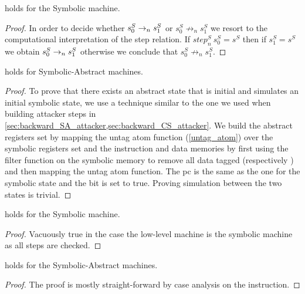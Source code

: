 \begin{lemma}
  \label{step_classic_symbolic}
   holds for the Symbolic machine.
\end{lemma}
\begin{proof}
  In order to decide whether $s^S_0\to_ns^S_1$ or
  $s^S_0 \not \to_n s^S_1$ we resort to the computational interpretation
  of the step relation. If $step^S_n ~ s^S_0 = s^S$ then if
  $s^S_1 = s^S$ we obtain $s^S_0\to_ns^S_1$ otherwise
  we conclude that $s^S_0 \not \to_n s^S_1$.
\end{proof}
\begin{lemma}
  \label{initial_refine_SA}
   holds for Symbolic-Abstract machines.
\end{lemma}
\begin{proof}
  To prove that there exists an abstract
  state that is initial and simulates an initial symbolic state, we
  use a technique similar to the one we used when building attacker
  steps in \cref{sec:backward_SA_attacker,sec:backward_CS_attacker}.
  We build the abstract registers set by mapping the untag atom
  function (\cref{untag_atom}) over the symbolic registers set and the
  instruction and data memories by first using the filter function on
  the symbolic memory to remove all data tagged \DATAname
  (respectively \INSTRname) and then mapping the untag atom function.
  The pc is the same as the one for the symbolic state and the \ok bit
  is set to true. Proving simulation between the two states is trivial.
\end{proof}

\begin{lemma}
  \label{cfg_nocheck_SA}
   holds for the Symbolic machine.
\end{lemma}
\begin{proof}
  Vacuously true in the case the low-level machine is
  the symbolic machine as all steps are checked.
\end{proof}

\begin{lemma}
  \label{cfg_equiv_SA}
   holds for the Symbolic-Abstract machines.
\end{lemma}
\begin{proof}
  The proof is mostly straight-forward by case analysis on the
  instruction.
\end{proof}

